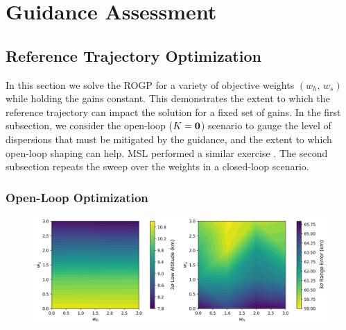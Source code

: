 \chapter{Guidance Assessment}\label{Ch:NumericalAssessment}

\section{Reference Trajectory Optimization}
In this section we solve the ROGP for a variety of objective weights $(w_h,\,w_s)$ while holding the gains constant. This demonstrates the extent to which the reference trajectory can impact the solution for a fixed set of gains. In the first subsection, we consider the open-loop ($K=\mathbf{0}$) scenario to gauge the level of dispersions that must be mitigated by the guidance, and the extent to which open-loop shaping can help. MSL performed a similar exercise \cite{MSL_EDL2}. The second subsection repeats the sweep over the weights in a closed-loop scenario.
\subsection{Open-Loop Optimization}
\begin{figure}[h!]
	\centering
	\includegraphics[width=1\textwidth]{Images/OpenLoop_WeightSweepMCResults}
	\caption{}
	\label{Fig:MCResultsOpenLoop}
\end{figure}

